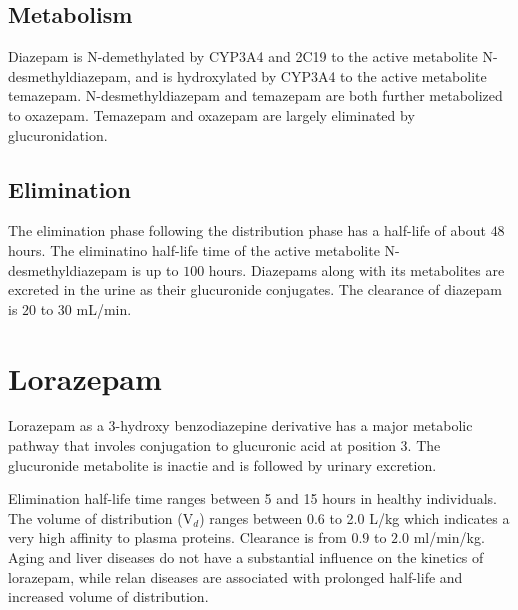 \subsection{Metabolism}
Diazepam is N-demethylated by CYP3A4 and 2C19 to the active metabolite N-desmethyldiazepam, and is hydroxylated by CYP3A4 to the active metabolite temazepam. N-desmethyldiazepam and temazepam are both further metabolized to oxazepam. Temazepam and oxazepam are largely eliminated by glucuronidation.
\subsection{Elimination}
The elimination phase following the distribution phase has a half-life of about $48$ hours. The eliminatino half-life time of the active metabolite N-desmethyldiazepam is up to $100$ hours. Diazepams along with its metabolites are excreted in the urine as their glucuronide conjugates. The clearance of diazepam is $20$ to $30$ mL/min. 

\section{Lorazepam}
Lorazepam as a 3-hydroxy benzodiazepine derivative has a major metabolic pathway that involes conjugation to glucuronic acid at position 3. The glucuronide metabolite is inactie and is followed by urinary excretion.

Elimination half-life time ranges between 5 and 15 hours in healthy individuals. The volume of distribution (V$_d$) ranges between 0.6 to 2.0 L/kg which indicates a very high affinity to plasma proteins. Clearance is from $0.9$ to $2.0$ ml/min/kg. Aging and liver diseases do not have a substantial influence on the kinetics of lorazepam, while relan diseases are associated with prolonged half-life and increased volume of distribution.\cite{Greenblatt1981}
